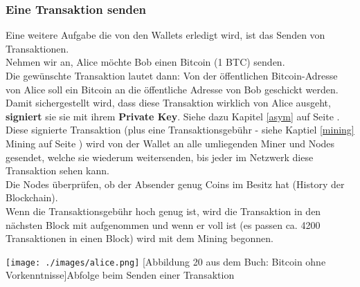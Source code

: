 \documentclass[10pt,a4paper,titlepage]{article}
\begin{document}
\subsubsection{Eine Transaktion senden}
Eine weitere Aufgabe die von den Wallets erledigt wird, ist das Senden von Transaktionen.\\
Nehmen wir an, Alice möchte Bob einen Bitcoin (1 BTC) senden.\\
Die gewünschte Transaktion lautet dann: Von der öffentlichen Bitcoin-Adresse von Alice soll ein Bitcoin an die öffentliche Adresse von Bob geschickt werden.\\
Damit sichergestellt wird, dass diese Transaktion wirklich von Alice ausgeht, \textbf{signiert} sie sie mit ihrem \textbf{Private Key}. Siehe dazu Kapitel \ref{asym} auf Seite \pageref{asym}.\\
Diese signierte Transaktion (plus eine Transaktionsgebühr - siehe Kaptiel \ref{mining} Mining auf Seite \pageref{mining}) wird von der Wallet an alle umliegenden Miner und Nodes gesendet, welche sie wiederum weitersenden, bis jeder im Netzwerk diese Transaktion sehen kann.\\
Die Nodes überprüfen, ob der Absender genug Coins im Besitz hat (History der Blockchain).\\
Wenn die Transaktionsgebühr hoch genug ist, wird die Transaktion in den nächsten Block mit aufgenommen und wenn er voll ist (es passen ca. 4200 Transaktionen in einen Block) wird mit dem Mining begonnen.
\begin{center}
\texttt{[image: ./images/alice.png]}
[Abbildung 20 aus dem Buch: Bitcoin ohne Vorkenntnisse]{Abfolge beim Senden einer Transaktion}
\end{center}
\end{document}
